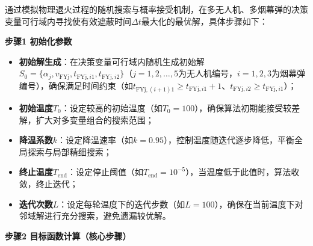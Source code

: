 \documentclass[../main.tex]{subfiles}
\begin{document}

通过模拟物理退火过程的随机搜索与概率接受机制，在多无人机、多烟幕弹的决策变量可行域内寻找使有效遮蔽时间$\Delta t$最大化的最优解，具体步骤如下：

\noindent\textbf{步骤1 初始化参数}
\begin{itemize}
    \item \textbf{初始解生成}：在决策变量可行域内随机生成初始解$S_0=\{\alpha_j, v_{\text{FYj}}, t_{\text{FYj},i1}, t_{\text{FYj},i2}\}$（$j=1,2,\dots,5$为无人机编号，$i=1,2,3$为烟幕弹编号），确保满足时间约束（如$t_{\text{FYj},(i+1)1} \geq t_{\text{FYj},i1}+1$、$t_{\text{FYj},i2} \geq t_{\text{FYj},i1}$）；
    \item \textbf{初始温度$T_0$}：设定较高的初始温度（如$T_0=100$），确保算法初期能接受较差解，扩大对多变量组合的搜索范围；
    \item \textbf{降温系数$k$}：设定降温速率（如$k=0.95$），控制温度随迭代逐步降低，平衡全局探索与局部精细搜索；
    \item \textbf{终止温度$T_{\text{end}}$}：设定停止阈值（如$T_{\text{end}}=10^{-5}$），当温度低于此值时，算法收敛，终止迭代；
    \item \textbf{迭代次数$L$}：设定每轮温度下的迭代步数（如$L=100$），确保在当前温度下对邻域解进行充分搜索，避免遗漏较优解。
\end{itemize}

\noindent\textbf{步骤2 目标函数计算（核心步骤）}
\end{document}
